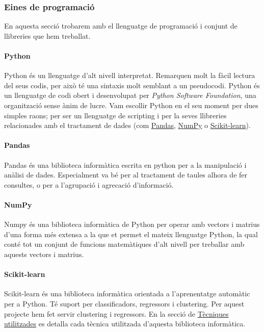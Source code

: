 \documentclass[11pt,a4paper,catalan]{article}
\begin{document}
\newpage
\subsubsection{Eines de programació}
En aquesta secció trobarem amb el llenguatge de programació i conjunt de llibreries que hem treballat.

\paragraph{Python}
Python és un llenguatge d'alt nivell interpretat. Remarquen molt la fàcil lectura del seus codis, per això té una sintaxis molt semblant a un pseudocodi. Python és un llenguatge de codi obert i desenvolupat per \textit{Python Software Foundation}, una organització sense ànim de lucre. Vam escollir Python en el seu moment per dues simples raons; per ser un llenguatge de scripting i per la seves llibreries relacionades amb el tractament de dades (com \hyperlink{pandas}{Pandas}, \hyperlink{numpy}{NumPy} o \hyperlink{sklearn}{Scikit-learn}).


\hypertarget{pandas}{
	\paragraph{Pandas}
}
Pandas és una biblioteca informàtica escrita en python per a la manipulació i anàlisi de dades. Especialment va bé per al tractament de taules alhora de fer consultes, o per a l'agrupació i agrecació d'informació.

\hypertarget{numpy}{
	\paragraph{NumPy}
}
Numpy és una biblioteca informàtica de Python per operar amb vectors i matrius d'una forma més extensa a la que et permet el mateix llenguatge Python, la qual conté tot un conjunt de funcions matemàtiques d'alt nivell per treballar amb aquests vectors i matrius.

\hypertarget{sklearn}{
	\paragraph{Scikit-learn}
}
Scikit-learn és una biblioteca informàtica orientada a l'aprenentatge automàtic per a Python. Té suport per classificadors, regressors i clustering. Per aquest projecte hem fet servir clustering i regressors. En la secció de \hyperlink{tecniquesutilitzades}{Tècniques utilitzades} es detalla cada tècnica utilitzada d'aquesta biblioteca informàtica.
\end{document}
